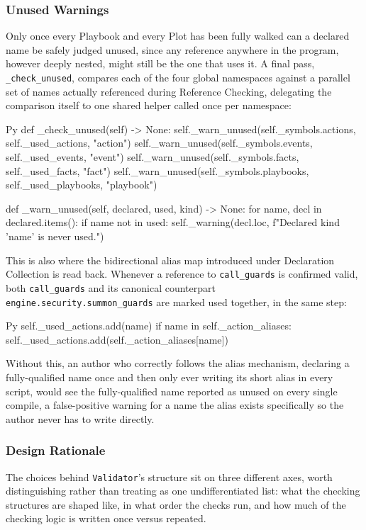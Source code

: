 \subsubsection{Unused Warnings}
Only once every Playbook and every Plot has been fully walked can a declared name be safely judged unused, since any reference anywhere in the program, however deeply nested, might still be the one that uses it. A final pass, \lstinline|_check_unused|, compares each of the four global namespaces against a parallel set of names actually referenced during Reference Checking, delegating the comparison itself to one shared helper called once per namespace:
\begin{codeblock}[]{Py}
def _check_unused(self) -> None:
    self._warn_unused(self._symbols.actions, self._used_actions, "action")
    self._warn_unused(self._symbols.events, self._used_events, "event")
    self._warn_unused(self._symbols.facts, self._used_facts, "fact")
    self._warn_unused(self._symbols.playbooks, self._used_playbooks, "playbook")

def _warn_unused(self, declared, used, kind) -> None:
    for name, decl in declared.items():
        if name not in used:
            self._warning(decl.loc, f"Declared {kind} '{name}' is never used.")
\end{codeblock}
This is also where the bidirectional alias map introduced under Declaration Collection is read back. Whenever a reference to \lstinline|call_guards| is confirmed valid, both \lstinline|call_guards| and its canonical counterpart \lstinline|engine.security.summon_guards| are marked used together, in the same step:
\begin{codeblock}[]{Py}
self._used_actions.add(name)
if name in self._action_aliases:
    self._used_actions.add(self._action_aliases[name])
\end{codeblock}
Without this, an author who correctly follows the alias mechanism, declaring a fully-qualified name once and then only ever writing its short alias in every script, would see the fully-qualified name reported as unused on every single compile, a false-positive warning for a name the alias exists specifically so the author never has to write directly.

\subsubsection{Design Rationale}
The choices behind \lstinline|Validator|'s structure sit on three different axes, worth distinguishing rather than treating as one undifferentiated list: what the checking structures are shaped like, in what order the checks run, and how much of the checking logic is written once versus repeated.

